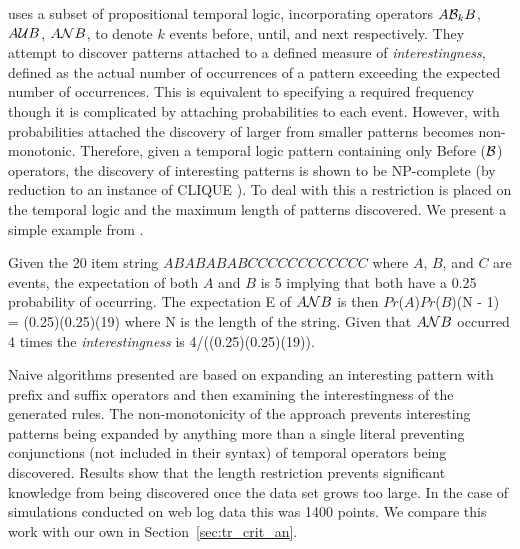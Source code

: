 \medskip
{}
\cite{bt98} uses a subset of propositional temporal logic,
incorporating operators
$A {\cal B}_k B$, $A {\cal U} B$, $A {\cal N} B$, to denote $k$ events
before, until, and next respectively. They attempt to discover patterns
attached to
a defined measure of {\em interestingness}, defined as the actual
number of occurrences of a pattern exceeding the expected number of
occurrences. This is equivalent to specifying a required frequency
though it is complicated by attaching probabilities to each event.
However, with probabilities attached the discovery of larger from smaller
patterns becomes non-monotonic. Therefore, given a temporal logic
pattern containing only Before (${\cal B}$) operators, the discovery of
interesting patterns is shown to be NP-complete (by reduction to an
instance of CLIQUE \cite{gj79}). To deal with this a
restriction is placed on the temporal logic and the maximum length of patterns
discovered. We present a simple example from \cite{bt98}.

\begin{example}
\begin{rm}
Given the 20 item string $ABABABABCCCCCCCCCCCC$ where $A$, $B$, and $C$ are
events, the expectation of both $A$ and $B$ is 5 implying that both have a 0.25
probability of occurring. The expectation E of 
$A {\cal N} B$ is then 
$Pr$($A$)$Pr$($B$)(N - 1) = (0.25)(0.25)(19) where N is the length of
the string.  Given that $A {\cal N} B$
occurred 4 times the {\em interestingness} is 4/((0.25)(0.25)(19)). 
\end{rm}
\end{example}

Naive algorithms presented are based on expanding an
interesting pattern with prefix and suffix operators and then
examining the interestingness of the generated rules. The
non-monotonicity of the approach prevents interesting patterns being
expanded by anything more than a single literal preventing
conjunctions (not included in their syntax) of temporal operators
being discovered. Results show that the length restriction prevents
significant knowledge from being discovered once the data set grows
too large. In the case of simulations conducted on web log data this
was 1400 points. We compare this work with our own in
Section~\ref{sec:tr_crit_an}.


\medskip
{}

